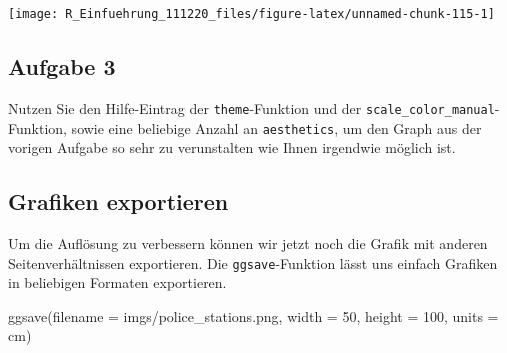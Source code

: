\documentclass[
]{book}
\newenvironment{Shaded}{\begin{snugshade}}{\end{snugshade}}
\newcommand{\AttributeTok}[1]{\textcolor[rgb]{0.77,0.63,0.00}{#1}}
\newcommand{\DecValTok}[1]{\textcolor[rgb]{0.00,0.00,0.81}{#1}}
\newcommand{\FunctionTok}[1]{\textcolor[rgb]{0.00,0.00,0.00}{#1}}
\newcommand{\NormalTok}[1]{#1}
\newcommand{\StringTok}[1]{\textcolor[rgb]{0.31,0.60,0.02}{#1}}
\begin{document}
\begin{center}\texttt{[image: R\_Einfuehrung\_111220\_files/figure-latex/unnamed-chunk-115-1]} \end{center}

\hypertarget{aufgabe-3-2}{%
\subsection{Aufgabe 3}\label{aufgabe-3-2}}

Nutzen Sie den Hilfe-Eintrag der \texttt{theme}-Funktion und der \texttt{scale\_color\_manual}-Funktion, sowie eine beliebige Anzahl an \texttt{aesthetics}, um den Graph aus der vorigen Aufgabe so sehr zu verunstalten wie Ihnen irgendwie möglich ist.

\hypertarget{grafiken-exportieren}{%
\subsection{Grafiken exportieren}\label{grafiken-exportieren}}

Um die Auflösung zu verbessern können wir jetzt noch die Grafik mit anderen Seitenverhältnissen exportieren. Die \texttt{ggsave}-Funktion lässt uns einfach Grafiken in beliebigen Formaten exportieren.

\begin{Shaded}
\begin{Highlighting}[]
\FunctionTok{ggsave}\NormalTok{(}\AttributeTok{filename =} \StringTok{\textquotesingle{}imgs/police\_stations.png\textquotesingle{}}\NormalTok{,}
      \AttributeTok{width =} \DecValTok{50}\NormalTok{,}
      \AttributeTok{height =} \DecValTok{100}\NormalTok{,}
      \AttributeTok{units =} \StringTok{\textquotesingle{}cm\textquotesingle{}}\NormalTok{)}
\end{Highlighting}
\end{Shaded}
\end{document}
